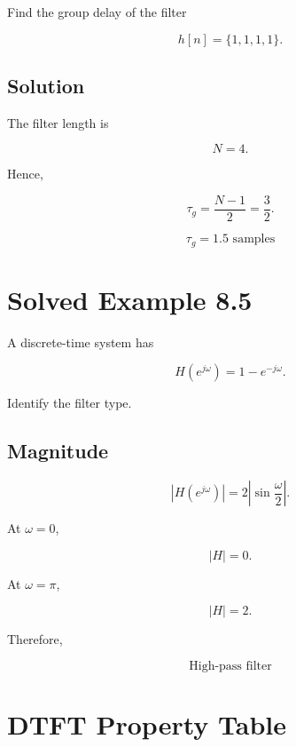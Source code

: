 Find the group delay of the filter

\[
h[n]=\{1,1,1,1\}.
\]


\subsection{Solution}

The filter length is

\[
N=4.
\]

Hence,

\[
\tau_g=
\frac{N-1}{2}
=
\frac{3}{2}.
\]

\[
\boxed{
\tau_g=1.5\text{ samples}
}
\]


\section{Solved Example 8.5}

A discrete-time system has

\[
H(e^{j\omega})=
1-e^{-j\omega}.
\]

Identify the filter type.


\subsection{Magnitude}

\[
|H(e^{j\omega})|=
2\left|\sin\frac{\omega}{2}\right|.
\]

At \(\omega=0\),

\[
|H|=0.
\]

At \(\omega=\pi\),

\[
|H|=2.
\]

Therefore,

\[
\boxed{
\text{High-pass filter}
}
\]


\section{DTFT Property Table}

